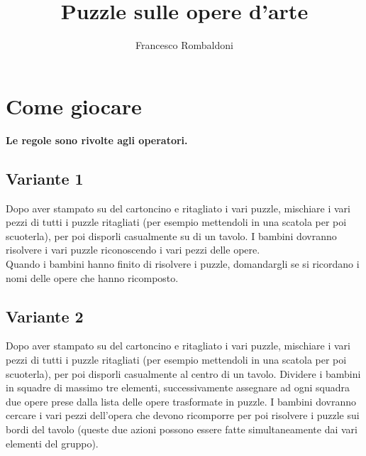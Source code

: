 \documentclass[hidelinks,12pt,a4paper]{article}
\begin{document}
	
	\title{\textbf{\\Puzzle sulle opere d'arte}}
	\author{Francesco Rombaldoni}
	\date{}
	
	\maketitle
	\newpage
	
	\tableofcontents
	\newpage
	
	\section{Come giocare}
	\begin{center}
		\textbf{Le regole sono rivolte agli operatori.}
	\end{center}
	
	\subsection{Variante 1}
	Dopo aver stampato su del cartoncino e ritagliato i vari puzzle, mischiare i vari pezzi di tutti i puzzle ritagliati (per esempio mettendoli in una scatola per poi scuoterla), per poi disporli casualmente su di un tavolo. I bambini dovranno risolvere i vari puzzle riconoscendo i vari pezzi delle opere.\\
	Quando i bambini hanno finito di risolvere i puzzle, domandargli se si ricordano i nomi delle opere che hanno ricomposto.
	
	\subsection{Variante 2}
	Dopo aver stampato su del cartoncino e ritagliato i vari puzzle, mischiare i vari pezzi di tutti i puzzle ritagliati (per esempio mettendoli in una scatola per poi scuoterla), per poi disporli casualmente al centro di un tavolo. Dividere i bambini in squadre di massimo tre elementi, successivamente assegnare ad ogni squadra due opere prese dalla lista delle opere trasformate in puzzle. I bambini dovranno cercare i vari pezzi dell'opera che devono ricomporre per poi risolvere i puzzle sui bordi del tavolo (queste due azioni possono essere fatte simultaneamente dai vari elementi del gruppo).
	
\end{document}
